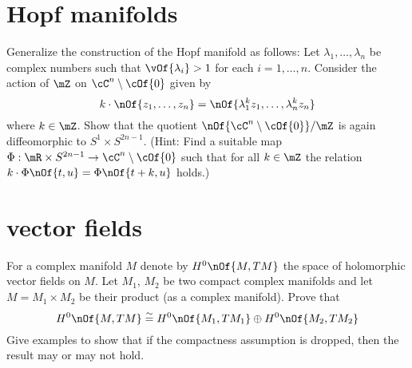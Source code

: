 \documentclass[11pt,a4paper]{scrartcl}
\begin{document}
	\section{Hopf manifolds}
	Generalize the construction of the Hopf manifold as follows: Let $\lambda_1,\dots,\lambda_n$ be complex numbers such that $\vOf{\lambda_i} > 1$ for each $i = 1, \dots, n$. Consider the action of $\mZ$ on $\cC^n\setminus\cOf{0}$ given by
	\begin{equation}
		k\cdot\nOf{z_1,\dots,z_n} = \nOf{\lambda_1^kz_1,\dots,\lambda_n^k z_n}
	\end{equation}
	where $k\in\mZ$. Show that the quotient $\nOf{\cC^n\setminus\cOf{0}}/\mZ$ is again diffeomorphic to $S^1\times S^{2n-1}$. (Hint: Find a suitable map $\Phi: \mR\times S^{2n-1}\to\cC^n\setminus\cOf{0}$ such that for all $k\in\mZ$ the relation $k\cdot\Phi\nOf{t,u} = \Phi\nOf{t+k,u}$ holds.)

	\section{vector fields}
	For a complex manifold $M$ denote by $H^0\nOf{M,TM}$ the space of holomorphic vector fields on $M$. Let $M_1$, $M_2$ be two compact complex manifolds and let $M = M_1\times M_2$ be their product (as a complex manifold). Prove that
	\begin{equation}
		H^0\nOf{M,TM} \stackrel{\sim}{=} H^0\nOf{M_1,TM_1} \oplus H^0\nOf{M_2,TM_2}
	\end{equation}
	Give examples to show that if the compactness assumption is dropped, then the result may or may not hold.
\end{document}
